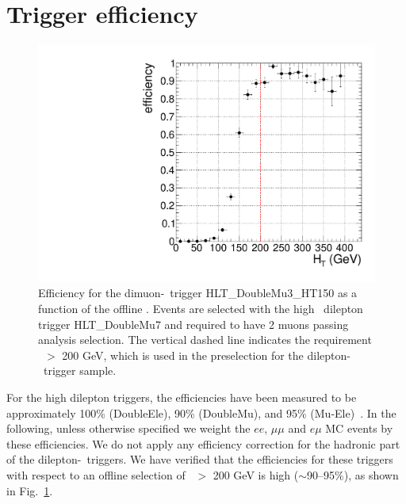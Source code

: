 \section{Trigger efficiency}
\label{sec:trgEff}


\begin{figure}[tbh]
\begin{center}
\includegraphics[width=0.6\linewidth]{plots/mmht.pdf}
\caption{\label{fig:httrig}\protect 
Efficiency for the dimuon-\Ht\ trigger HLT\_DoubleMu3\_HT150 
as a function of the offline \Ht. Events are selected with the high \pt\ dilepton trigger 
HLT\_DoubleMu7 and required to have 2 muons passing analysis selection.
The vertical dashed line indicates the requirement \Ht\ $>$ 200 GeV, which is used in the
preselection for the dilepton-\Ht\ trigger sample.
}
\end{center}
\end{figure}

For the high \pt dilepton triggers, the efficiencies have been measured to be approximately
100\% (DoubleEle), 90\% (DoubleMu), and 95\% (Mu-Ele)~\cite{ref:HWW}. 
In the following, unless otherwise specified we weight the $ee$, $\mu\mu$ and $e\mu$ MC events 
by these efficiencies. We do not apply any efficiency correction for the hadronic 
part of the dilepton-\Ht\ triggers. We have verified that the efficiencies for these triggers
with respect to an offline selection of \Ht\ $>$ 200 GeV is high ($\sim$90--95\%), 
as shown in Fig.~\ref{fig:httrig}.



